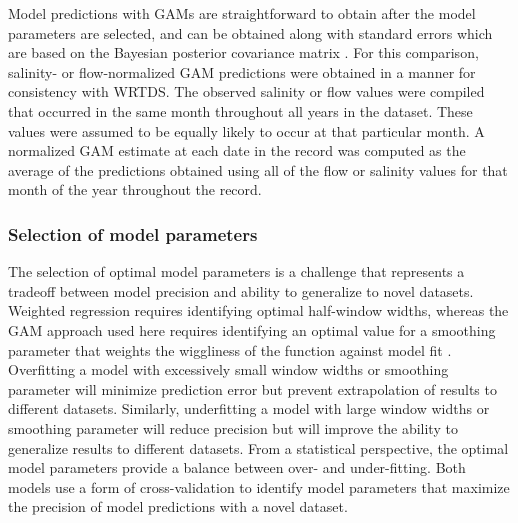 \documentclass[letterpaper,12pt,oneside]{article}\usepackage[]{graphicx}\usepackage[]{color}
\begin{document}
Model predictions with \acp{GAM} are straightforward to obtain after the model parameters are selected, and can be obtained along with standard errors which are based on the Bayesian posterior covariance matrix \citep{Wood06}. For this comparison, salinity- or flow-normalized \ac{GAM} predictions were obtained in a manner for consistency with \ac{WRTDS}. The observed salinity or flow values were compiled that occurred in the same month throughout all years in the dataset. These values were assumed to be equally likely to occur at that particular month.  A normalized \ac{GAM} estimate at each date in the record was computed as the average of the predictions obtained using all of the flow or salinity values for that month of the year throughout the record. 

\subsubsection{Selection of model parameters}

The selection of optimal model parameters is a challenge that represents a tradeoff between model precision and ability to generalize to novel datasets.  Weighted regression requires identifying optimal half-window widths, whereas the \ac{GAM} approach used here requires identifying an optimal value for a smoothing parameter that weights the wiggliness of the function against model fit \citep{Wood06}.  Overfitting a model with excessively small window widths or smoothing parameter will minimize prediction error but prevent extrapolation of results to different datasets. Similarly, underfitting a model with large window widths or smoothing parameter will reduce precision but will improve the ability to generalize results to different datasets. From a statistical perspective, the optimal model parameters provide a balance between over- and under-fitting.  Both models use a form of cross-validation to identify model parameters that maximize the precision of model predictions with a novel dataset.   
\end{document}
